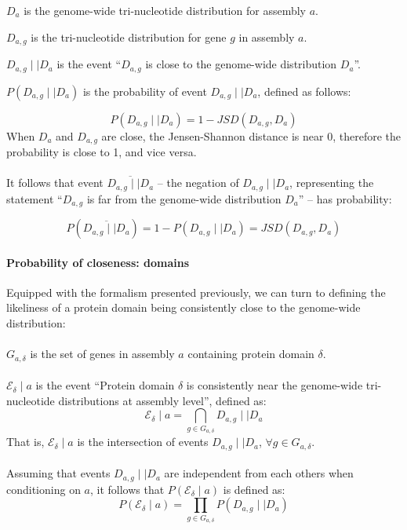 \documentclass[12pt]{article}
\begin{document}
\begin{description}
	\item $D_a$ is the genome-wide tri-nucleotide distribution for assembly $a$.
	\item $D_{a,g}$ is the tri-nucleotide distribution for gene $g$ in assembly $a$.  
	\item $D_{a,g} \mid\mid D_a$ is the event ``$D_{a,g}$ is close to the genome-wide distribution $D_a$''.
	\item $P(D_{a,g} \mid\mid D_a)$ is the probability of event $D_{a,g} \mid\mid D_a$, defined as follows:
\end{description}
%
\begin{equation}
P(D_{a,g} \mid\mid D_a) = 1 - JSD(D_{a,g}, D_a)
\end{equation}
%
When $D_a$ and $D_{a,g}$ are close, the Jensen-Shannon distance is near 0, therefore the probability is close to 1, and vice versa.\\
\\
It follows that event $\overline{D_{a,g} \mid\mid D_a}$ -- the negation of $D_{a,g} \mid\mid D_a$, representing the statement ``$D_{a,g}$ is far from the genome-wide distribution $D_a$'' -- has probability:

\begin{equation}
P(\overline{D_{a,g} \mid\mid D_a}) = 1 - P(D_{a,g} \mid\mid D_a) = JSD(D_{a,g}, D_a)
\end{equation}

\paragraph{Probability of closeness: domains}
Equipped with the formalism presented previously, we can turn to defining the likeliness of a protein domain being consistently close to the genome-wide distribution:\\
\\
$G_{a, \delta}$ is the set of genes in assembly $a$ containing protein domain $\delta$.\\
\\
$\mathscr{E_{\delta}} \mid a$ is the event ``Protein domain $\delta$ is consistently near the genome-wide tri-nucleotide distributions at assembly level'', defined as:
%
\begin{equation}
\mathscr{E_{\delta}} \mid a = \bigcap\limits_{g \in G_{a, \delta}} D_{a,g} \mid\mid D_a
\end{equation}
%
That is, $\mathscr{E_{\delta}} \mid a$ is the intersection of events $D_{a,g} \mid\mid D_a$, $\forall g \in G_{a, \delta}$.\\
\\
Assuming that events $D_{a,g} \mid\mid D_a$ are independent from each others when conditioning on $a$, it follows that $P(\mathscr{E_{\delta}} \mid a)$ is defined as:
%
\begin{equation}
P(\mathscr{E_{\delta}} \mid a) = \prod\limits_{g \in G_{a, \delta}} P(D_{a,g} \mid\mid D_a)
\label{eq:assembly_probability}
\end{equation}
\end{document}
